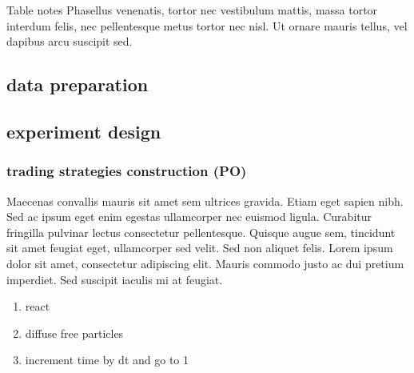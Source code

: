 \documentclass[10pt,letterpaper]{article}
\begin{document}
\begin{table}[!ht]
\begin{adjustwidth}{-2.25in}{0in}
\begin{flushleft} Table notes Phasellus venenatis, tortor nec vestibulum mattis, massa tortor interdum felis, nec pellentesque metus tortor nec nisl. Ut ornare mauris tellus, vel dapibus arcu suscipit sed.
\end{flushleft}
\label{table1}
\end{adjustwidth}

\end{table}


\subsection*{data preparation}

\subsection*{experiment design}

\subsubsection*{trading strategies construction (PO)}
Maecenas convallis mauris sit amet sem ultrices gravida. Etiam eget sapien nibh. Sed ac ipsum eget enim egestas ullamcorper nec euismod ligula. Curabitur fringilla pulvinar lectus consectetur pellentesque. Quisque augue sem, tincidunt sit amet feugiat eget, ullamcorper sed velit. Sed non aliquet felis. Lorem ipsum dolor sit amet, consectetur adipiscing elit. Mauris commodo justo ac dui pretium imperdiet. Sed suscipit iaculis mi at feugiat.

\begin{enumerate}
	\item{react}
	\item{diffuse free particles}
	\item{increment time by dt and go to 1}
\end{enumerate}
\end{document}
